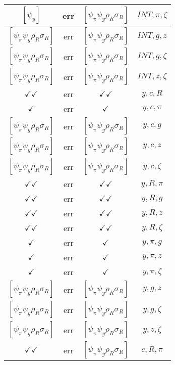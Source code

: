 \documentclass[a4paper,10pt]{article}
\begin{document}
\begin{longtable}{|c|c|c|c|}
\hline
$[\psi_y ]$ & err & $[\psi_\pi \psi_y \rho_R \sigma_R ]$ & ${INT},{\pi},{\zeta}$ \\
\hline
$[\psi_\pi \psi_y \rho_R \sigma_R ]$ & err & $[\psi_\pi \psi_y \rho_R \sigma_R ]$ & ${INT},{g},{z}$ \\
\hline
$[\psi_\pi \psi_y \rho_R \sigma_R ]$ & err & $[\psi_\pi \psi_y \rho_R \sigma_R ]$ & ${INT},{g},{\zeta}$ \\
\hline
$[\psi_\pi \psi_y \rho_R \sigma_R ]$ & err & $[\psi_\pi \psi_y \rho_R \sigma_R ]$ & ${INT},{z},{\zeta}$ \\
\hline
$\checkmark\checkmark$ & err & $\checkmark\checkmark$ & ${y},{c},{R}$ \\
\hline
$\checkmark$ & err & $\checkmark$ & ${y},{c},{\pi}$ \\
\hline
$[\psi_\pi \psi_y \rho_R \sigma_R ]$ & err & $[\psi_\pi \psi_y \rho_R \sigma_R ]$ & ${y},{c},{g}$ \\
\hline
$[\psi_\pi \psi_y \rho_R \sigma_R ]$ & err & $[\psi_\pi \psi_y \rho_R \sigma_R ]$ & ${y},{c},{z}$ \\
\hline
$[\psi_\pi \psi_y \rho_R \sigma_R ]$ & err & $[\psi_\pi \psi_y \rho_R \sigma_R ]$ & ${y},{c},{\zeta}$ \\
\hline
$\checkmark\checkmark$ & err & $\checkmark\checkmark$ & ${y},{R},{\pi}$ \\
\hline
$\checkmark\checkmark$ & err & $\checkmark\checkmark$ & ${y},{R},{g}$ \\
\hline
$\checkmark\checkmark$ & err & $\checkmark\checkmark$ & ${y},{R},{z}$ \\
\hline
$\checkmark\checkmark$ & err & $\checkmark\checkmark$ & ${y},{R},{\zeta}$ \\
\hline
$\checkmark$ & err & $\checkmark$ & ${y},{\pi},{g}$ \\
\hline
$\checkmark$ & err & $\checkmark$ & ${y},{\pi},{z}$ \\
\hline
$\checkmark$ & err & $\checkmark$ & ${y},{\pi},{\zeta}$ \\
\hline
$[\psi_\pi \psi_y \rho_R \sigma_R ]$ & err & $[\psi_\pi \psi_y \rho_R \sigma_R ]$ & ${y},{g},{z}$ \\
\hline
$[\psi_\pi \psi_y \rho_R \sigma_R ]$ & err & $[\psi_\pi \psi_y \rho_R \sigma_R ]$ & ${y},{g},{\zeta}$ \\
\hline
$[\psi_\pi \psi_y \rho_R \sigma_R ]$ & err & $[\psi_\pi \psi_y \rho_R \sigma_R ]$ & ${y},{z},{\zeta}$ \\
\hline
$\checkmark\checkmark$ & err & $[\psi_\pi \psi_y \rho_R \sigma_R ]$ & ${c},{R},{\pi}$ \\

\end{longtable}
\end{document}
